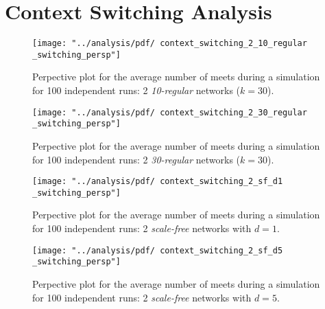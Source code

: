 \renewcommand\thefigure{\thesection.\arabic{figure}}    
\setcounter{figure}{0}   

\renewcommand\thetable{\thesection.\arabic{table}}    
\setcounter{table}{0}     


\section{Context Switching Analysis}
\label{append_ctx_switching}

\begin{figure}[H]
	\centering
	\texttt{[image: "../analysis/pdf/   context\_switching\_2\_10\_regular \_switching\_persp"]}
	\begin{minipage}{0.9\textwidth}
		\caption{Perpective plot for the average number of meets during a simulation for 100 independent runs: 2 \textit{10-regular} networks ($k = 30$).}
		\label{append_fig:ctx_cs_2_10kreg}
	\end{minipage}
\end{figure}

\begin{figure}[H]
	\centering
	\texttt{[image: "../analysis/pdf/   context\_switching\_2\_30\_regular \_switching\_persp"]}
	\begin{minipage}{0.9\textwidth}
		\caption{Perpective plot for the average number of meets during a simulation for 100 independent runs: 2 \textit{30-regular} networks ($k = 30$).}
		\label{append_fig:ctx_cs_2_30kreg}
	\end{minipage}
\end{figure}

\begin{figure}[H]
	\centering
	\texttt{[image: "../analysis/pdf/   context\_switching\_2\_sf\_d1 \_switching\_persp"]}
	\begin{minipage}{0.9\textwidth}
		\caption{Perpective plot for the average number of meets during a simulation for 100 independent runs: 2 \textit{scale-free} networks with $d=1$.}
		\label{append_fig:ctx_cs_2_sd_d1}
	\end{minipage}
\end{figure}

\begin{figure}[H]
	\centering
	\texttt{[image: "../analysis/pdf/   context\_switching\_2\_sf\_d5 \_switching\_persp"]}
	\begin{minipage}{0.9\textwidth}
		\caption{Perpective plot for the average number of meets during a simulation for 100 independent runs: 2 \textit{scale-free} networks with $d=5$.}
		\label{append_fig:ctx_cs_2_sd_d5}
	\end{minipage}
\end{figure}

